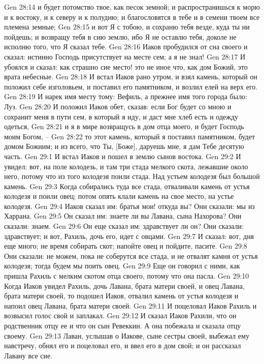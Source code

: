 Gen 28:14  и будет потомство твое, как песок земной; и распространишься к морю и к востоку, и к северу и к полудню; и благословятся в тебе и в семени твоем все племена земные;
Gen 28:15  и вот Я с тобою, и сохраню тебя везде, куда ты ни пойдешь; и возвращу тебя в сию землю, ибо Я не оставлю тебя, доколе не исполню того, что Я сказал тебе.
Gen 28:16  Иаков пробудился от сна своего и сказал: истинно Господь присутствует на месте сем; а я не знал!
Gen 28:17  И убоялся и сказал: как страшно сие место! это не иное что, как дом Божий, это врата небесные.
Gen 28:18  И встал Иаков рано утром, и взял камень, который он положил себе изголовьем, и поставил его памятником, и возлил елей на верх его.
Gen 28:19  И нарек имя месту тому: Вефиль, а прежнее имя того города было: Луз.
Gen 28:20  И положил Иаков обет, сказав: если Бог будет со мною и сохранит меня в пути сем, в который я иду, и даст мне хлеб есть и одежду одеться,
Gen 28:21  и я в мире возвращусь в дом отца моего, и будет Господь моим Богом, --
Gen 28:22  то этот камень, который я поставил памятником, будет домом Божиим; и из всего, что Ты, [Боже], даруешь мне, я дам Тебе десятую часть.
Gen 29:1  И встал Иаков и пошел в землю сынов востока.
Gen 29:2  И увидел: вот, на поле колодезь, и там три стада мелкого скота, лежавшие около него, потому что из того колодезя поили стада. Над устьем колодезя был большой камень.
Gen 29:3  Когда собирались туда все стада, отваливали камень от устья колодезя и поили овец; потом опять клали камень на свое место, на устье колодезя.
Gen 29:4  Иаков сказал им: братья мои! откуда вы? Они сказали: мы из Харрана.
Gen 29:5  Он сказал им: знаете ли вы Лавана, сына Нахорова? Они сказали: знаем.
Gen 29:6  Он еще сказал им: здравствует ли он? Они сказали: здравствует; и вот, Рахиль, дочь его, идет с овцами.
Gen 29:7  И сказал: вот, дня еще много; не время собирать скот; напойте овец и пойдите, пасите.
Gen 29:8  Они сказали: не можем, пока не соберутся все стада, и не отвалят камня от устья колодезя; тогда будем мы поить овец.
Gen 29:9  Еще он говорил с ними, как пришла Рахиль с мелким скотом отца своего, потому что она пасла.
Gen 29:10  Когда Иаков увидел Рахиль, дочь Лавана, брата матери своей, и овец Лавана, брата матери своей, то подошел Иаков, отвалил камень от устья колодезя и напоил овец Лавана, брата матери своей.
Gen 29:11  И поцеловал Иаков Рахиль и возвысил голос свой и заплакал.
Gen 29:12  И сказал Иаков Рахили, что он родственник отцу ее и что он сын Ревеккин. А она побежала и сказала отцу своему.
Gen 29:13  Лаван, услышав о Иакове, сыне сестры своей, выбежал ему навстречу, обнял его и поцеловал его, и ввел его в дом свой; и он рассказал Лавану все сие.
